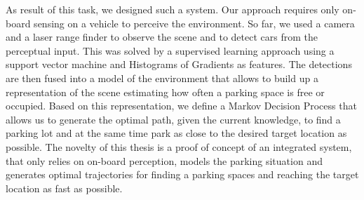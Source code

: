     As result of this task, we designed such a system. Our approach requires
    only on-board sensing on a vehicle to perceive the environment. So far, we
    used a camera and a laser range finder to observe the scene and to detect
    cars from the perceptual input. This was solved by a supervised learning
    approach using a support vector machine and Histograms of Gradients  as
    features. The detections are then fused into a model of the environment
    that allows to build up a representation of the scene estimating how often
    a parking space is free or occupied.  Based on this representation, we
    define a Markov Decision Process that allows us to generate the optimal
    path, given the current knowledge, to find a parking lot and at the same
    time park as close to the desired target location as possible. The novelty
    of this thesis is a proof of concept of an integrated system, that only
    relies on on-board perception, models the parking situation and generates
    optimal trajectories for finding a parking spaces and reaching the target
    location as fast as possible.


